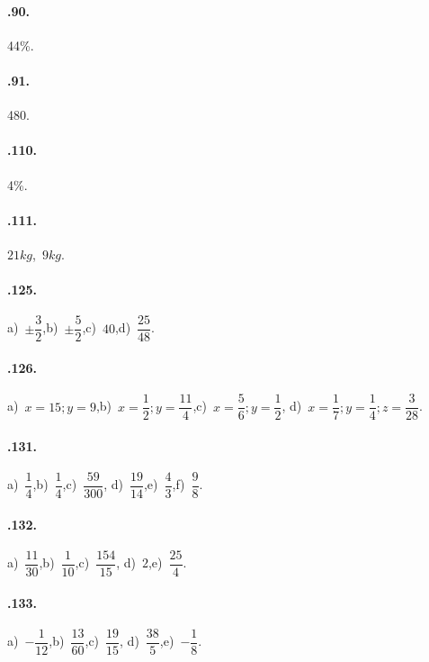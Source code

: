 \begin{multicols}{2}
\paragraph{\thechapter.90.} 44\%.

\paragraph{\thechapter.91.} 480.

\paragraph{\thechapter.110.} 4\%.

\paragraph{\thechapter.111.}
$21\unit{kg}$,~$9\unit{kg}$.

\paragraph{\thechapter.125.}
a)~$\pm\dfrac{3}{2}$,\quad b)~$\pm\dfrac{5}{2}$,\quad c)~$40$,\quad d)~$\dfrac{25}{48}$.

\paragraph{\thechapter.126.}
a)~$x=15; y=9$,\quad b)~$x=\dfrac{1}{2}; y=\dfrac{11}{4}$,\quad c)~$x=\dfrac{5}{6}; %
y=\dfrac{1}{2}$,\quad %
d)~$x=\dfrac{1}{7}; y=\dfrac{1}{4}; z=\dfrac{3}{28}$.

\paragraph{\thechapter.131.}
a)~$\dfrac{1}{4}$,\quad b)~$\dfrac{1}{4}$,\quad c)~$\dfrac{59}{300}$,\quad %
d)~$\dfrac{19}{14}$,\quad e)~$\dfrac{4}{3}$,\quad f)~$\dfrac{9}{8}$.

\paragraph{\thechapter.132.}
a)~$\dfrac{11}{30}$,\quad b)~$\dfrac{1}{10}$,\quad c)~$\dfrac{154}{15}$,\quad %
d)~$2$,\quad e)~$\dfrac{25}{4}$.

\paragraph{\thechapter.133.}
a)~$-\dfrac{1}{12}$,\quad b)~$\dfrac{13}{60}$,\quad c)~$\dfrac{19}{15}$,\quad %
d)~$\dfrac{38}{5}$,\quad e)~$-\dfrac{1}{8}$.


\end{multicols}
